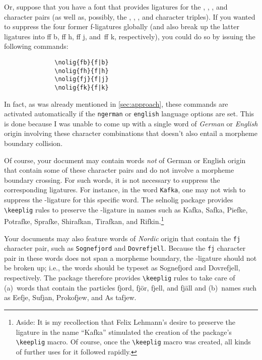 \documentclass[11pt]{article}
\newcommand{\pkg}[1]{\textsf{#1}}
\newcommand{\opt}[1]{\texttt{#1}}
\newcommand{\cmmd}[1]{\texttt{\textbackslash #1}}
\begin{document}

Or, suppose that you have a font that provides ligatures for the {\ebg {}, , ,} and {\ebg{}} character pairs (as well as, possibly, the {\ebg {}, , ,} and {\ebg{}} character triples). If you wanted to suppress the four former f-ligatures globally (and also break up the latter ligatures into ff\kern0pt b, ff\kern0pt h, ff\kern0pt j, and~ff\kern0pt k, respectively), you could do so by issuing the following commands: 
\begin{Verbatim}
              \nolig{fb}{f|b}
              \nolig{fh}{f|h}
              \nolig{fj}{f|j}
              \nolig{fk}{f|k}
\end{Verbatim}
In fact, as was already mentioned in \cref{sec:approach}, these commands are activated automatically if the \opt{ngerman} or \opt{english} language options are set. This is done because I was unable to come up with a single word of \emph{German} or \emph{English} origin involving these character combinations that doesn't also entail a morpheme boundary collision.

Of course, your document may contain words \emph{not} of German or English origin that contain some of these character pairs and do not involve a morpheme boundary crossing. For such words, it is not necessary to suppress the corresponding ligatures. For instance, in the word \opt{Kafka}, one may not wish to suppress the {\ebg{}}-ligature for this specific word. The \pkg{selnolig} package provides \cmmd{keeplig} rules to preserve the {\ebg{}}-ligature in names such as {\ebg Kafka, Safka, Piefke, Potrafke, Sprafke, Shirafkan, Tirafkan}, and {\ebg Rifkin}.\footnote{Aside: It is my recollection that Felix Lehmann's desire to preserve the {\ebg{}} ligature in the name \enquote{{\ebg Kafka}} stimulated the creation of the package's \cmmd{keeplig} macro. Of course, once the \cmmd{keeplig} macro was created, all kinds of further uses for it followed rapidly.} 

Your documents may also feature words of \emph{Nordic} origin that contain the \opt{fj} character pair, such as \opt{Sognefjord} and \opt{Dovrefjell}. Because the \opt{fj} character pair in these words does not span a morpheme boundary, the {\ebg{}}-ligature should not be broken up; i.e., the words should be typeset as {\ebg Sognefjord} and {\ebg Dovrefjell}, respectively. The package therefore provides \cmmd{keeplig} rules to take care of (a)~words that contain the particles {\ebg fjord, fjör, fjell}, and {\ebg fjäll} and (b)~names such as {\ebg Eefje, Sufjan, Prokofjew}, and {\ebg As\kern0pt tafjew}.
\end{document}

